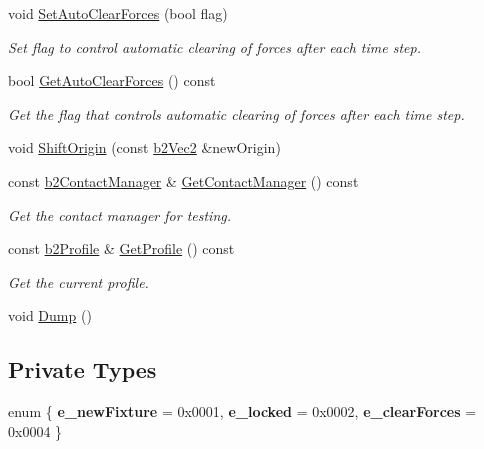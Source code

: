 \begin{DoxyCompactItemize}
\mbox{\label{classb2World_aa2bced28ddef5bbb00ed5666e5e9f620}} 
void \mbox{\hyperlink{classb2World_aa2bced28ddef5bbb00ed5666e5e9f620}{Set\+Auto\+Clear\+Forces}} (bool flag)
\begin{DoxyCompactList}\small\item\em Set flag to control automatic clearing of forces after each time step. \end{DoxyCompactList}\item 
\mbox{\label{classb2World_ae1fa8272edf37a4e2a7be08f6e0a8cc6}} 
bool \mbox{\hyperlink{classb2World_ae1fa8272edf37a4e2a7be08f6e0a8cc6}{Get\+Auto\+Clear\+Forces}} () const
\begin{DoxyCompactList}\small\item\em Get the flag that controls automatic clearing of forces after each time step. \end{DoxyCompactList}\item 
void \mbox{\hyperlink{classb2World_afc33e20e64252c5be115216051408047}{Shift\+Origin}} (const \mbox{\hyperlink{structb2Vec2}{b2\+Vec2}} \&new\+Origin)
\item 
\mbox{\label{classb2World_a3d321151cd851d39bdc8fe52a5be426c}} 
const \mbox{\hyperlink{classb2ContactManager}{b2\+Contact\+Manager}} \& \mbox{\hyperlink{classb2World_a3d321151cd851d39bdc8fe52a5be426c}{Get\+Contact\+Manager}} () const
\begin{DoxyCompactList}\small\item\em Get the contact manager for testing. \end{DoxyCompactList}\item 
\mbox{\label{classb2World_aec4fb0a888e69e0db7f37a4921761711}} 
const \mbox{\hyperlink{structb2Profile}{b2\+Profile}} \& \mbox{\hyperlink{classb2World_aec4fb0a888e69e0db7f37a4921761711}{Get\+Profile}} () const
\begin{DoxyCompactList}\small\item\em Get the current profile. \end{DoxyCompactList}\item 
void \mbox{\hyperlink{classb2World_a73c1fec260d460514edd335d4c235893}{Dump}} ()
\end{DoxyCompactItemize}
\subsection*{Private Types}
\begin{DoxyCompactItemize}
\item 
\mbox{\label{classb2World_a4f7243fc660ab7441065969a882240eb}} 
enum \{ {\bfseries e\+\_\+new\+Fixture} = 0x0001, 
{\bfseries e\+\_\+locked} = 0x0002, 
{\bfseries e\+\_\+clear\+Forces} = 0x0004
 \}
\end{DoxyCompactItemize}
